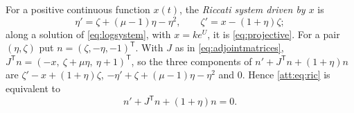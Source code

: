 For a positive continuous function $x(t)$, the \emph{Riccati system driven by $x$} is
\begin{equation}\label{att:eq:ric}
\eta'=\zeta+(\mu-1)\eta-\eta^{2},\qquad \zeta'=x-(1+\eta)\zeta ;
\end{equation}
along a solution of \eqref{eq:logsystem}, with $x=ke^{U}$, it is \eqref{eq:projective}. For a pair $(\eta,\zeta)$ put $n=(\zeta,-\eta,-1)^{\mathsf T}$. With $J$ as in \eqref{eq:adjointmatrices}, $J^{\mathsf T}n=(-x,\ \zeta+\mu\eta,\ \eta+1)^{\mathsf T}$, so the three components of $n'+J^{\mathsf T}n+(1+\eta)n$ are $\zeta'-x+(1+\eta)\zeta$, $-\eta'+\zeta+(\mu-1)\eta-\eta^2$ and $0$. Hence \eqref{att:eq:ric} is equivalent to
\begin{equation}\label{att:eq:normal}
n'+J^{\mathsf T}n+(1+\eta)n=0 .
\end{equation}

